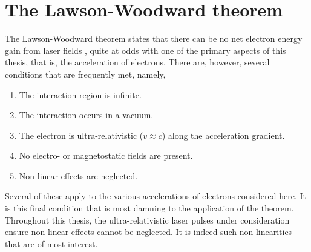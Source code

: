\section{The Lawson-Woodward theorem}\label{sec:intro-lawson_woodward}
The Lawson-Woodward theorem states that there can be no net electron energy gain from laser fields \cite{esareyPhysicsLaserdrivenPlasmabased2009}, quite at odds with one of the primary aspects of this thesis, that is, the acceleration of electrons. There are, however, several conditions that are frequently met, namely,
\begin{enumerate}
	\item The interaction region is infinite.
	\item The interaction occurs in a vacuum.
	\item The electron is ultra-relativistic ($v\approx c$) along the acceleration gradient.
	\item No electro- or magnetostatic fields are present.
	\item Non-linear effects are neglected.
\end{enumerate}
Several of these apply to the various accelerations of electrons considered here. It is this final condition that is most damning to the application of the theorem. Throughout this thesis, the ultra-relativistic laser pulses under consideration ensure non-linear effects cannot be neglected. It is indeed such non-linearities that are of most interest.

